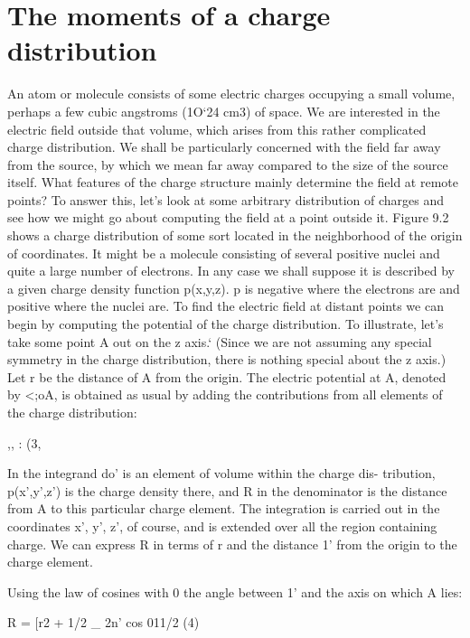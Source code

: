 \iffalse

\section{The moments of a charge distribution}

An atom or molecule consists of some electric charges occupying
a small volume, perhaps a few cubic angstroms (1O‘24 cm3) of space.
We are interested in the electric field outside that volume, which
arises from this rather complicated charge distribution. We shall
be particularly concerned with the field far away from the source,
by which we mean far away compared to the size of the source itself.
What features of the charge structure mainly determine the field at
remote points? To answer this, let's look at some arbitrary distribution
of charges and see how we might go about computing the field
at a point outside it. Figure 9.2 shows a charge distribution of some
sort located in the neighborhood of the origin of coordinates. It
might be a molecule consisting of several positive nuclei and quite
a large number of electrons. In any case we shall suppose it is described
by a given charge density function p(x,y,z). p is negative
where the electrons are and positive where the nuclei are. To find
the electric field at distant points we can begin by computing the
potential of the charge distribution. To illustrate, let's take some
point A out on the z axis.‘ (Since we are not assuming any special
symmetry in the charge distribution, there is nothing special about
the z axis.) Let r be the distance of A from the origin. The electric
potential at A, denoted by <;oA, is obtained as usual by adding the
contributions from all elements of the charge distribution:

\begin{equation}
\end{equation}
,, :  (3,

In the integrand do' is an element of volume within the charge dis-
tribution, p(x',y',z') is the charge density there, and R in the denominator
is the distance from A to this particular charge element. The
integration is carried out in the coordinates x', y', z', of course, and
is extended over all the region containing charge. We can express R
in terms of r and the distance 1' from the origin to the charge element.

Using the law of cosines with 0 the angle between 1' and the axis on
which A lies:

\begin{equation}
\end{equation}
R = [r2 + 1/2 _ 2n' cos 011/2 (4)

